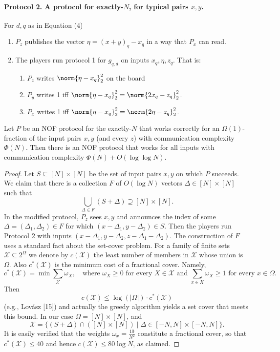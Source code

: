 \paragraph{Protocol 2. A protocol for exactly-$N$, for typical pairs $x,y$.}
For $d,q$ as in Equation (4)
\begin{enumerate}
\item $P_z$ publishes the vector $\eta=(x+y)_q-x_q$ in a way that $P_x$ can read.
\item The players run protocol 1 for $g_{q,d}$ on inputs $x_q,\eta,z_q$. That is:
\begin{enumerate}
\item $P_z$ writes $\norm{\eta-x_q}_2^2$ on the board
\item $P_y$ writes 1 iff $\norm{\eta-x_q}_2^2=\norm{2x_q-z_q}_2^2$.
\item $P_x$ writes 1 iff $\norm{\eta-x_q}_2^2=\norm{2\eta-z_q}_2^2$.
\end{enumerate}
\end{enumerate}
\begin{proposition}
Let $P$ be an NOF protocol for the exactly-$N$ that works correctly for an $\Omega(1)$-fraction of the input pairs $x,y$ (and every $z$) with communication complexity $\Phi(N)$. Then there is an NOF protocol that works for all inputs with communication complexity $\Phi(N)+O(\log\log N)$.
\end{proposition}
\begin{proof}
Let $S\subseteq[N]\times[N]$ be the set of input pairs $x,y$ on which $P$ succeeds. We claim that there is a collection $F$ of $O(\log N)$ vectors $\Delta\in[N]\times[N]$ such that
\[\bigcup_{\Delta\in F}(S+\Delta)\supseteq[N]\times[N].\]
In the modified protocol, $P_z$ sees $x,y$ and announces the index of some $\Delta=(\Delta_1,\Delta_2)\in F$ for which $(x-\Delta_1,y-\Delta_2)\in S$. Then the players run Protocol 2 with inputs $(x-\Delta_1,y-\Delta_2,z-\Delta_1-\Delta_2)$.
The construction of $F$ uses a standard fact about the set-cover problem. For a family of finite sets $\mathcal X\subseteq2^\Omega$ we denote by $c(\mathcal X)$ the least number of members in $\mathcal X$ whose union is $\Omega$. Also $c^*(\mathcal X)$ is the minimum cost of a fractional cover. Namely,
\[c^*(\mathcal X)=\min\sum_{\mathcal X}\omega_X,\quad\text{where }\omega_X\ge0\text{ for every }X\in\mathcal X\text{ and }\sum_{x\in X}\omega_X\ge1\text{ for every }x\in\Omega.\]
Then
\[c(\mathcal X)\le\log(|\Omega|)\cdot c^*(\mathcal X)\]
(e.g., Lov\'asz [15]) and actually the greedy algorithm yields a set cover that meets this bound.
In our case $\Omega=[N]\times[N]$, and
\[\mathcal X=\{(S+\Delta)\cap([N]\times[N])\mid\Delta\in[-N,N]\times[-N,N]\}.\]
It is easily verified that the weights $\omega_x=\frac{10}{N^2}$ constitute a fractional cover, so that $c^*(\mathcal X)\le40$ and hence $c(\mathcal X)\le80\log N$, as claimed.
\end{proof}
